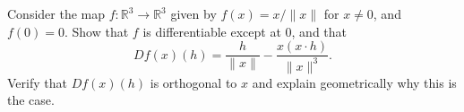 Consider the map $f:\mathbb R^3\to\mathbb R^3$ given by $f(x)=x/\|x\|$ for $x\ne0$, and $f(0)=0$. Show that $f$ is differentiable except at $0$, and that
\[
Df(x)(h)=\frac{h}{\|x\|}-\frac{x(x\cdot h)}{\|x\|^3}.
\]
Verify that $Df(x)(h)$ is orthogonal to $x$ and explain geometrically why this is the case.
